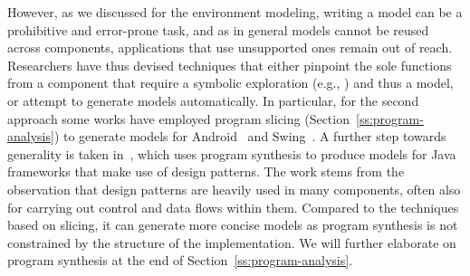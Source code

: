 {However, as we discussed for the environment modeling, writing a model can be a prohibitive and error-prone task, and as in general models cannot be reused across components, applications that use unsupported ones remain out of reach. Researchers have thus devised techniques that either pinpoint the sole functions from a component that require a symbolic exploration (e.g., \cite{AOH-TACAS07,XXT-ICSE11}) and thus a model, or attempt to generate models automatically. In particular, for the second approach some works have employed program slicing (Section~\ref{ss:program-analysis}) to generate models for Android~\cite{VTV-SEN15} and Swing~\cite{CT-SEN14}. A further step towards generality is taken in~\cite{JQF-ICSE16}, which uses program synthesis to produce models for Java frameworks that make use of design patterns. The work stems from the observation that design patterns are heavily used in many components, often also for carrying out control and data flows within them. Compared to the techniques based on slicing, it can generate more concise models as program synthesis is not constrained by the structure of the implementation. We will further elaborate on program synthesis at the end of Section~\ref{ss:program-analysis}.
}